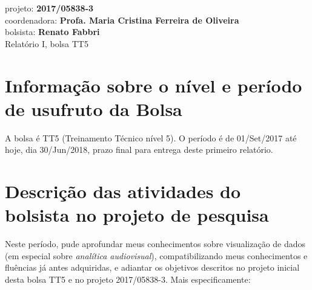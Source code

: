 \documentclass[a4paper, 11pt]{article}
\begin{document}
\noindent
\normalsize projeto: \textbf{2017/05838-3} \\
coordenadora: \textbf{Profa. Maria Cristina Ferreira de Oliveira} \\
bolsista: \textbf{Renato Fabbri} \\
Relatório I, bolsa TT5 \\

\section*{Informação sobre o nível e período de usufruto da Bolsa}
A bolsa é TT5 (Treinamento Técnico nível 5).
O período é de 01/Set/2017 até hoje, dia 30/Jun/2018,
prazo final para entrega deste primeiro relatório.

% 
\section*{Descrição das atividades do bolsista no projeto de pesquisa}
Neste período, pude aprofundar meus conhecimentos sobre visualização de dados
(em especial sobre \emph{analítica audiovisual}),
compatibilizando meus conhecimentos e fluências já antes adquiridas,
e adiantar os objetivos descritos no projeto inicial desta bolsa TT5 e no
projeto 2017/05838-3.
Mais especificamente:
\end{document}

